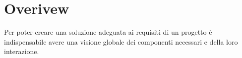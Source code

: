 \section{Overivew}

Per poter creare una soluzione adeguata ai requisiti di un progetto \`e indispensabile avere una visione globale dei componenti necessari e della loro interazione. 
